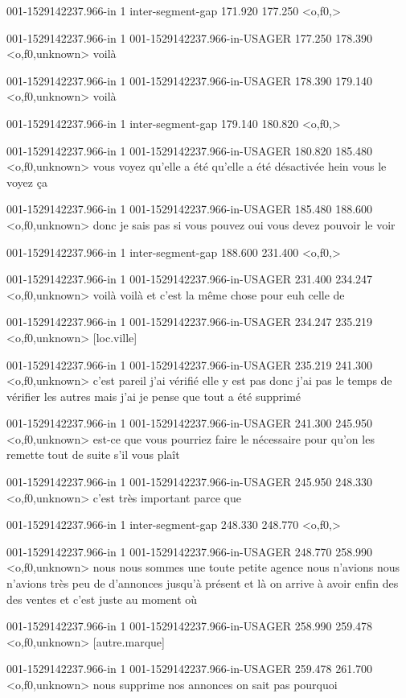 001-1529142237.966-in 1 inter-segment-gap 171.920 177.250 <o,f0,>

001-1529142237.966-in 1 001-1529142237.966-in-USAGER 177.250 178.390 <o,f0,unknown> voilà

001-1529142237.966-in 1 001-1529142237.966-in-USAGER 178.390 179.140 <o,f0,unknown> voilà

001-1529142237.966-in 1 inter-segment-gap 179.140 180.820 <o,f0,>

001-1529142237.966-in 1 001-1529142237.966-in-USAGER 180.820 185.480 <o,f0,unknown> vous voyez qu'elle a été qu'elle a été désactivée hein vous le voyez ça

001-1529142237.966-in 1 001-1529142237.966-in-USAGER 185.480 188.600 <o,f0,unknown> donc je sais pas si vous pouvez oui vous devez pouvoir le voir

001-1529142237.966-in 1 inter-segment-gap 188.600 231.400 <o,f0,>

001-1529142237.966-in 1 001-1529142237.966-in-USAGER 231.400 234.247 <o,f0,unknown> voilà voilà et c'est la même chose pour euh celle de

001-1529142237.966-in 1 001-1529142237.966-in-USAGER 234.247 235.219 <o,f0,unknown> [loc.ville]

001-1529142237.966-in 1 001-1529142237.966-in-USAGER 235.219 241.300 <o,f0,unknown> c'est pareil j'ai vérifié elle y est pas donc j'ai pas le temps de vérifier les autres mais j'ai je pense que tout a été supprimé

001-1529142237.966-in 1 001-1529142237.966-in-USAGER 241.300 245.950 <o,f0,unknown> est-ce que vous pourriez faire le nécessaire pour qu'on les remette tout de suite s'il vous plaît

001-1529142237.966-in 1 001-1529142237.966-in-USAGER 245.950 248.330 <o,f0,unknown> c'est très important parce que

001-1529142237.966-in 1 inter-segment-gap 248.330 248.770 <o,f0,>

001-1529142237.966-in 1 001-1529142237.966-in-USAGER 248.770 258.990 <o,f0,unknown> nous nous sommes une toute petite agence nous n'avions nous n'avions très peu de d'annonces jusqu'à présent et là on arrive à avoir enfin des des ventes et c'est juste au moment où

001-1529142237.966-in 1 001-1529142237.966-in-USAGER 258.990 259.478 <o,f0,unknown> [autre.marque]

001-1529142237.966-in 1 001-1529142237.966-in-USAGER 259.478 261.700 <o,f0,unknown> nous supprime nos annonces on sait pas pourquoi

